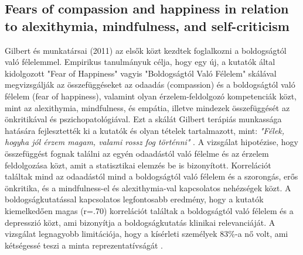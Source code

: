\subsection{Fears of compassion and happiness in relation
	to alexithymia, mindfulness, and self-criticism \cite{gilbert_mcewan_gibbons_chotai_duarte_matos_2011}}
Gilbert és munkatársai (2011) az elsők közt kezdtek foglalkozni a boldogságtól való félelemmel. Empirikus tanulmányuk célja, hogy egy új, a kutatók által kidolgozott "Fear of Happiness" vagyis "Boldogságtól Való Félelem" skálával \cite{gilbert_mcewan_gibbons_chotai_duarte_matos_2011} megvizsgálják az összefüggéseket az odaadás (compassion) és a boldogságtól való félelem (fear of happiness), valamint olyan érzelem-feldolgozó kompetenciák közt, mint az  alexithymia, mindfulness, és empátia, illetve mindezek összefüggését az önkritikával és pszichopatológiával. Ezt a skálát Gilbert terápiás munkassága hatására fejlesztették ki a kutatók és olyan tételek tartalmazott, mint: \textit{"Félek, hogyha jól érzem magam, valami rossz fog történni"} \cite[o. 381]{gilbert_mcewan_gibbons_chotai_duarte_matos_2011}. A vizsgálat hipotézise, hogy összefüggést fognak találni az egyén odaadástól való félelme és az érzelem feldolgozása közt, amit a statisztikai elemzés be is bizonyított. Korrelációt találtak mind az odaadástól mind a boldogságtól való félelem és a szorongás, erős önkritika, és a mindfulness-el és alexithymia-val kapcsolatos nehézségek közt. A boldogságkutatással kapcsolatos legfontosabb eredmény, hogy a kutatók kiemelkedően magas (r=.70) korrelációt találtak a boldogságtól való félelem és a depresszió közt, ami bizonyítja a boldogságkutatás klinikai relevanciáját. A vizsgálat legnagyobb limitációja, hogy a kísérleti személyek 83\%-a nő volt, ami kétségessé teszi a minta reprezentatívságát \cite{gilbert_mcewan_gibbons_chotai_duarte_matos_2011}.

